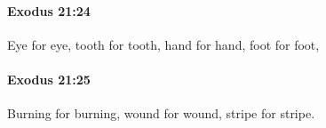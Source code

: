 		\paragraph{Exodus 21:24} %
			\label{EXODUS-21-24}

			Eye for eye, tooth for tooth, hand for hand, foot for foot,


		\paragraph{Exodus 21:25} %
			\label{EXODUS-21-25}

			Burning for burning, wound for wound, stripe for stripe.


